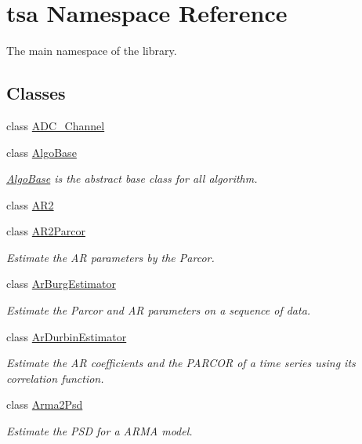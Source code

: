 \hypertarget{namespacetsa}{}\section{tsa Namespace Reference}
\label{namespacetsa}


The main namespace of the library.  


\subsection*{Classes}
\begin{DoxyCompactItemize}
\item 
class \hyperlink{classtsa_1_1_a_d_c___channel}{A\+D\+C\+\_\+\+Channel}
\item 
class \hyperlink{classtsa_1_1_algo_base}{Algo\+Base}
\begin{DoxyCompactList}\small\item\em \hyperlink{classtsa_1_1_algo_base}{Algo\+Base} is the abstract base class for all algorithm. \end{DoxyCompactList}\item 
class \hyperlink{classtsa_1_1_a_r2}{A\+R2}
\item 
class \hyperlink{classtsa_1_1_a_r2_parcor}{A\+R2\+Parcor}
\begin{DoxyCompactList}\small\item\em Estimate the AR parameters by the Parcor. \end{DoxyCompactList}\item 
class \hyperlink{classtsa_1_1_ar_burg_estimator}{Ar\+Burg\+Estimator}
\begin{DoxyCompactList}\small\item\em Estimate the Parcor and AR parameters on a sequence of data. \end{DoxyCompactList}\item 
class \hyperlink{classtsa_1_1_ar_durbin_estimator}{Ar\+Durbin\+Estimator}
\begin{DoxyCompactList}\small\item\em Estimate the AR coefficients and the P\+A\+R\+C\+OR of a time series using its correlation function. \end{DoxyCompactList}\item 
class \hyperlink{classtsa_1_1_arma2_psd}{Arma2\+Psd}
\begin{DoxyCompactList}\small\item\em Estimate the P\+SD for a A\+R\+MA model. \end{DoxyCompactList}\item 

\end{DoxyCompactItemize}
